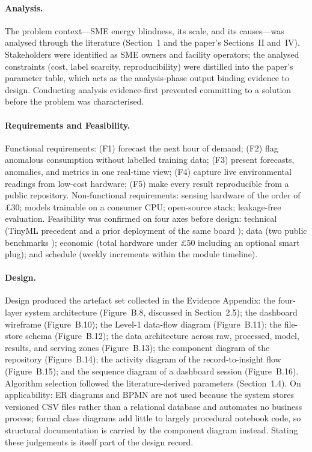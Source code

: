 \documentclass[11pt,a4paper]{article}
\begin{document}
\paragraph{Analysis.}
The problem context---SME energy blindness, its scale, and its causes---was
analysed through the literature (Section~1 and the paper's Sections~II and~IV).
Stakeholders were identified as SME owners and facility operators; the analysed
constraints (cost, label scarcity, reproducibility) were distilled into the
paper's parameter table, which acts as the analysis-phase output binding
evidence to design. Conducting analysis evidence-first prevented committing to a
solution before the problem was characterised.

\paragraph{Requirements and Feasibility.}
Functional requirements: (F1) forecast the next hour of demand; (F2) flag
anomalous consumption without labelled training data; (F3) present forecasts,
anomalies, and metrics in one real-time view; (F4) capture live environmental
readings from low-cost hardware; (F5) make every result reproducible from a
public repository. Non-functional requirements: sensing hardware of the order of
\pounds30; models trainable on a consumer CPU; open-source stack; leakage-free
evaluation. Feasibility was confirmed on four axes before design: technical
(TinyML precedent \cite{warden2019tinyml} and a prior deployment of the same
board \cite{baskar2024edge}); data (two public benchmarks
\cite{hebrail2012individual}); economic (total hardware under \pounds50
including an optional smart plug); and schedule (weekly increments within the
module timeline).

\paragraph{Design.}
Design produced the artefact set collected in the Evidence Appendix: the
four-layer system architecture (Figure~B.8, discussed in Section~2.5); the
dashboard wireframe (Figure~B.10); the Level-1 data-flow diagram (Figure~B.11);
the file-store schema (Figure~B.12); the data architecture across raw,
processed, model, results, and serving zones (Figure~B.13); the component
diagram of the repository (Figure~B.14); the activity diagram of the
record-to-insight flow (Figure~B.15); and the sequence diagram of a dashboard
session (Figure~B.16). Algorithm selection followed the literature-derived
parameters (Section~1.4). On applicability: ER diagrams and BPMN are not used
because the system stores versioned CSV files rather than a relational database
and automates no business process; formal class diagrams add little to largely
procedural notebook code, so structural documentation is carried by the
component diagram instead. Stating these judgements is itself part of the design
record.
\end{document}
